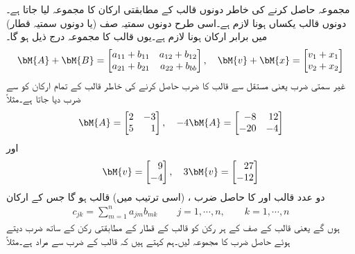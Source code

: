 مجموعہ حاصل کرنے کی خاطر دونوں قالب کے مطابقتی ارکان کا مجموعہ لیا جاتا ہے۔دونوں قالب یکساں  ہونا لازم ہے۔اسی طرح دونوں سمتیہ صف (یا دونوں سمتیہ قطار) میں برابر ارکان ہونا لازم ہے۔یوں  قالب کا مجموعہ درج ذیل ہو گا۔
\begin{align}
\bM{A}+\bM{B}=
\begin{bmatrix*}[r]
a_{11}+b_{11} & a_{12}+b_{12}\\
a_{21}+b_{21}& a_{22}+b_{bb}
\end{bmatrix*}, \quad \bM{v}+\bM{x}=
\begin{bmatrix*}[r]
v_1+x_1\\
v_2+x_2
\end{bmatrix*}
\end{align} 
 غیر سمتی ضرب یعنی مستقل   سے قالب کا ضرب حاصل کرنے کی خاطر قالب کے تمام ارکان کو  سے ضرب دیا جاتا ہے۔مثلاً 
\begin{align*}
\bM{A}=
\begin{bmatrix*}[r]
2& -3\\
5&1
\end{bmatrix*}, \quad 
-4\bM{A}=
\begin{bmatrix*}[r]
-8&12\\
-20&-4
\end{bmatrix*}
\end{align*}
اور
\begin{align*}
\bM{v}=
\begin{bmatrix*}[r]
9\\
-4
\end{bmatrix*}, \quad 
3\bM{v}=
\begin{bmatrix*}[r]
27\\
-12
\end{bmatrix*}
\end{align*}
دو عدد  قالب  اور   کا حاصل ضرب ، (اسی ترتیب میں)  قالب  ہو گا جس کے ارکان 
\begin{align}
c_{jk}=\sum_{m=1}^{n} a_{jm} b_{mk} \quad \quad j=1, \cdots, n, \quad\quad k=1,\cdots,n
\end{align}
ہوں گے یعنی  قالب کے  صف کے ہر رکن کو  قالب کے  قطار کے مطابقتی رکن کے ساتھ ضرب دیتے ہوئے  حاصل ضرب  کا مجموعہ لیں۔ہم کہتے ہیں کہ قالب کے ضرب سے مراد   ہے۔مثلاً
